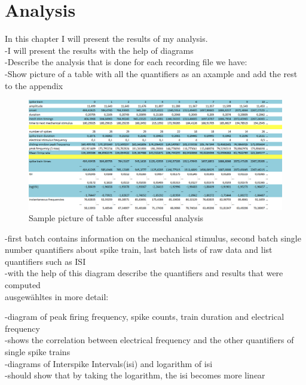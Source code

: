 \chapter{Analysis}

In this chapter I will present the results of my analysis.\\
-I will present the results with the help of diagrams\\

-Describe the analysis that is done for each recording file we have:\\
-Show picture of a table with all the quantifiers as an axample and add the rest to the appendix\\
\begin{figure}
	\includegraphics[width = \textwidth]{src/pic/sc_table}
	\caption{Sample picture of table after successful analysis }
	\label{fig:table_sc}
\end{figure}
-first batch contains information on the mechanical stimulus, second batch single number quantifiers about spike train, last batch lists of raw data and list quantifiers such as ISI\\
-with the help of this diagram describe the quantifiers and results that were computed\\


ausgewähltes in more detail:

-diagram of peak firing frequency, spike counts, train duration and electrical frequency\\
-shows the correlation between electrical frequency and the other quantifiers of single spike trains\\

-diagrams of Interspike Intervals(isi) and logarithm of isi\\
-should show that by taking the logarithm, the isi becomes more linear\\




\cleardoublepage
